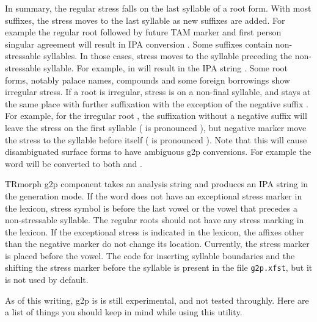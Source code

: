 \documentclass[twocolumn]{article}
\begin{document}
In summary, the regular stress falls on the last syllable of a root form.
With most suffixes, the stress moves to the last syllable as new suffixes are added.
For example the regular root  followed by future TAM marker and first person singular agreement will result in IPA conversion .
Some suffixes contain non-stressable syllables.
In those cases, stress moves to the syllable preceding the non-stressable syllable.
For example,  in  will result in the IPA string .
Some root forms, notably palace names, compounds and some foreign borrowings show irregular stress.
If a root is irregular, stress is on a non-final syllable, 
and stays at the same place with further suffixation with the exception of the negative suffix .
For example, for the irregular root , 
the suffixation without a negative suffix will leave the stress on the first syllable 
( is pronounced ), 
but negative marker move the stress to the syllable before itself
( is pronounced ). 
Note that this will cause disambiguated surface forms to have ambiguous g2p conversions. 
For example the word  will be converted to both 
 and
.

TRmorph g2p component takes an analysis string and produces an IPA string in the generation mode.
If the word does not have an exceptional stress marker in the lexicon,
stress symbol is before the last vowel or the vowel that precedes a non-stressable syllable.
The regular roots should not have any stress marking in the lexicon.
If the exceptional stress is indicated in the lexicon,
the affixes other than the negative marker do not change its location.
Currently, the stress marker is placed before the vowel.
The code for inserting syllable boundaries and the shifting the stress marker before the syllable is present in the file \lstinline{g2p.xfst},
but it is not used by default.

As of this writing, g2p is is still experimental, and not tested throughly.
Here are a list of things you should keep in mind while using this utility.
\end{document}
